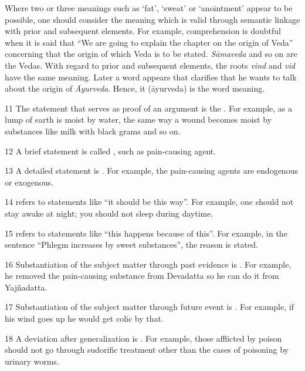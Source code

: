 \begin{translation}
   Where two or three meanings such as `fat’, `sweat’ or `anointment’ appear to be possible, one should consider the meaning which is valid through semantic linkage with prior and subsequent elements. For example, comprehension is doubtful when it is said that “We are going to explain the chapter on the origin of Veda” concerning that the origin of which Veda is to be stated. \emph{Sāmaveda} and so on are the Vedas. With regard to prior and subsequent elements, the roots \emph{vind} and \emph{vid} have the same meaning. Later a word appears that clarifies that he wants to talk about the origin of \emph{Āyurveda}. Hence, it (āyurveda) is the word meaning.  

\item [11] The statement that serves as proof of an argument is the 
. For example, as a lump of earth is moist by water, the 
same way a wound becomes moist by substances like milk with black grams and 
so on.  

\item [12] A brief statement is called , such as 
 {pain-causing agent}. 

\item [13] A detailed statement is . For example, the 
pain-causing agents are endogenous or exogenous. 

\item [14]  refers to statements like ``it should be this way''. For example, one should not stay awake at night; 
you should not sleep during daytime.  

\item [15]  refers to statements like “this happens because of this”. For example, in the sentence “Phlegm 
increases by sweet substances”, the reason is stated.  

\item [16] Substantiation of the subject matter through past evidence is . 
For example, he removed the pain-causing substance 
from Devadatta so he can do it from Yajñadatta. 

\item [17] Substantiation of the subject matter through future event is 
. For example, if his wind goes up he would get colic by that. 

\item [18] A deviation after generalization is . For example, those afflicted by poison should not go through sudorific treatment other than the cases of poisoning by urinary worms.


\end{translation}
